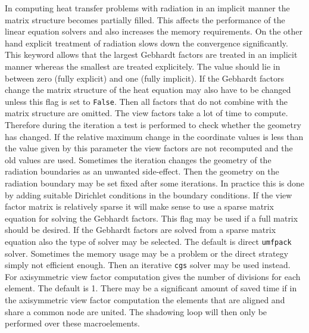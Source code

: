 %
In computing heat transfer problems with radiation in an implicit manner the matrix structure 
becomes partially filled. This affects the performance of the linear equation solvers
and also increases the memory requirements. On the other hand explicit treatment 
of radiation slows down the convergence significantly. This keyword allows
that the largest Gebhardt factors are treated in an implicit manner whereas
the smallest are treated explicitely. The value should lie in between 
zero (fully explicit) and one (fully implicit).
%
If the Gebhardt factors change the matrix structure of the heat equation
may also have to be changed unless this flag is set to \texttt{False}.
Then all factors that do not combine with the matrix structure are omitted.
%
The view factors take a lot of time to compute. Therefore during the iteration a test is performed 
to check whether the geometry has changed. If the relative maximum change in the coordinate 
values is less than the value given by this parameter the view factors are not recomputed and
the old values are used. 
%
Sometimes the iteration changes the geometry of the radiation
boundaries as an unwanted side-effect. Then the geometry on the radiation 
boundary may be set fixed after some iterations. In practice this is done by adding
suitable Dirichlet conditions in the boundary conditions.
%
If the view factor matrix is relatively sparse it will make sense
to use a sparse matrix equation for solving the Gebhardt factors.
This flag may be used if a full matrix should be desired.
%
If the Gebhardt factors are solved from a sparse matrix equation 
also the type of solver may be selected. The default is 
direct \texttt{umfpack} solver. Sometimes the memory usage may be a problem
or the direct strategy simply not efficient enough. Then 
an iterative \texttt{cgs} solver may be used instead.
%
For axisymmetric view factor computation gives the number of divisions for each element.
The default is 1. 
%
There may be a significant amount of saved time if in the axisymmetric view factor computation 
the elements that are aligned and share a common node are united. The shadowing loop will then
only be performed over these macroelements.
\sifend


